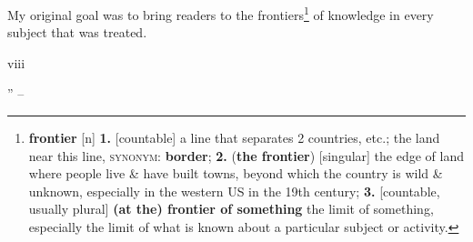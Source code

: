 \documentclass[oneside]{book}
\numberwithin{equation}{section}
\begin{document}
My original goal was to bring readers to the frontiers\footnote{\textbf{frontier} [n] \textbf{1.} [countable] a line that separates 2 countries, etc.; the land near this line, \textsc{synonym}: \textbf{border}; \textbf{2.} (\textbf{the frontier}) [singular] the edge of land where people live \& have built towns, beyond which the country is wild \& unknown, especially in the western US in the 19th century; \textbf{3.} [countable, usually plural] \textbf{(at the) frontier of something} the limit of something, especially the limit of what is known about a particular subject or activity.} of knowledge in every subject that was treated.

viii

'' -- \cite[Preface, pp. v--]{Knuth1997}




\printbibliography[heading=bibintoc]
	
\end{document}

